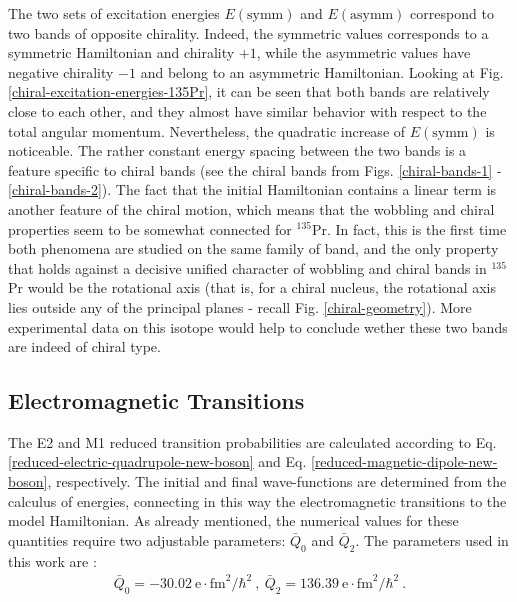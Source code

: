 The two sets of excitation energies $E(\text{symm})$ and $E(\text{asymm})$ correspond to two bands of opposite chirality. Indeed, the symmetric values corresponds to a symmetric Hamiltonian and chirality $+1$, while the asymmetric values have negative chirality $-1$ and belong to an asymmetric Hamiltonian. Looking at Fig. \ref{chiral-excitation-energies-135Pr}, it can be seen that both bands are relatively close to each other, and they almost have similar behavior with respect to the total angular momentum. Nevertheless, the quadratic increase of $E(\text{symm})$ is noticeable. The rather constant energy spacing between the two bands is a feature specific to chiral bands \cite{raduta2020new} (see the chiral bands from Figs. \ref{chiral-bands-1} - \ref{chiral-bands-2}). The fact that the initial Hamiltonian contains a linear term is another feature of the chiral motion, which means that the wobbling and chiral properties seem to be somewhat connected for $^{135}$Pr. In fact, this is the first time both phenomena are studied on the same family of band, and the only property that holds against a decisive unified character of wobbling and chiral bands in $^{135}$Pr would be the rotational axis (that is, for a chiral nucleus, the rotational axis lies outside any of the principal planes - recall Fig. \ref{chiral-geometry}). More experimental data on this isotope would help to conclude wether these two bands are indeed of chiral type. 
\subsection{Electromagnetic Transitions}

The E2 and M1 reduced transition probabilities are calculated according to Eq. \ref{reduced-electric-quadrupole-new-boson} and Eq. \ref{reduced-magnetic-dipole-new-boson}, respectively. The initial and final wave-functions are determined from the calculus of energies, connecting in this way the electromagnetic transitions to the model Hamiltonian. As already mentioned, the numerical values for these quantities require two adjustable parameters: $\bar{Q}_0$ and $\bar{Q}_2$. The parameters used in this work are \cite{raduta2020new}:
\begin{align}
    \bar{Q}_0=-30.02\ \mathrm{e}\cdot\text{fm}^2/\hbar^2\ ,\ \bar{Q}_2=136.39\ \mathrm{e}\cdot\text{fm}^2/\hbar^2\ .
\end{align}

